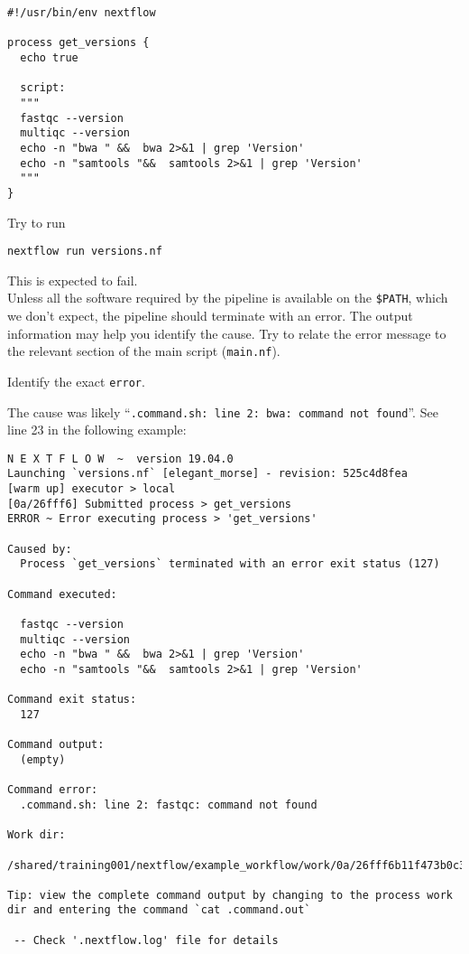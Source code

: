 \begin{lstlisting}
#!/usr/bin/env nextflow

process get_versions {
  echo true

  script:
  """
  fastqc --version
  multiqc --version
  echo -n "bwa " &&  bwa 2>&1 | grep 'Version'
  echo -n "samtools "&&  samtools 2>&1 | grep 'Version'
  """
}
\end{lstlisting}



\begin{steps}
Try to run
\begin{lstlisting}
nextflow run versions.nf
\end{lstlisting}
\end{steps}

\begin{warning}
This is expected to fail.\\
Unless all the software required by the pipeline is available on the \texttt{\$PATH},
which we don't expect, the pipeline should terminate with an error.
The output information may help you identify the cause. 
Try to relate the error message to the relevant section of the main script (\texttt{main.nf}). 
\end{warning}


\begin{questions}
Identify the exact \texttt{error}. 
\begin{answer}
The cause was likely ``\texttt{.command.sh: line 2: bwa: command not found}''. 
See line 23 in the following example:

\begin{lstlisting}
N E X T F L O W  ~  version 19.04.0
Launching `versions.nf` [elegant_morse] - revision: 525c4d8fea
[warm up] executor > local
[0a/26fff6] Submitted process > get_versions
ERROR ~ Error executing process > 'get_versions'

Caused by:
  Process `get_versions` terminated with an error exit status (127)

Command executed:

  fastqc --version
  multiqc --version
  echo -n "bwa " &&  bwa 2>&1 | grep 'Version'
  echo -n "samtools "&&  samtools 2>&1 | grep 'Version'

Command exit status:
  127

Command output:
  (empty)

Command error:
  .command.sh: line 2: fastqc: command not found

Work dir:
  /shared/training001/nextflow/example_workflow/work/0a/26fff6b11f473b0c3f0b3961608462

Tip: view the complete command output by changing to the process work dir and entering the command `cat .command.out`

 -- Check '.nextflow.log' file for details

\end{lstlisting}
\end{answer}
\end{questions}


